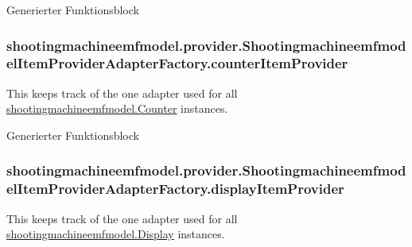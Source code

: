 Generierter Funktionsblock \hypertarget{classshootingmachineemfmodel_1_1provider_1_1_shootingmachineemfmodel_item_provider_adapter_factory_a66df12b1ede3faf4c051e2e72922bbbc}{
\subsubsection[{counter\-Item\-Provider}]{ shootingmachineemfmodel.\-provider.\-Shootingmachineemfmodel\-Item\-Provider\-Adapter\-Factory.\-counter\-Item\-Provider\hspace{0.3cm}{\ttfamily [protected]}}}\label{classshootingmachineemfmodel_1_1provider_1_1_shootingmachineemfmodel_item_provider_adapter_factory_a66df12b1ede3faf4c051e2e72922bbbc}
This keeps track of the one adapter used for all \hyperlink{interfaceshootingmachineemfmodel_1_1_counter}{shootingmachineemfmodel.\-Counter} instances.

Generierter Funktionsblock \hypertarget{classshootingmachineemfmodel_1_1provider_1_1_shootingmachineemfmodel_item_provider_adapter_factory_abed64251d753a775ee21b8cf1d23855b}{
\subsubsection[{display\-Item\-Provider}]{ shootingmachineemfmodel.\-provider.\-Shootingmachineemfmodel\-Item\-Provider\-Adapter\-Factory.\-display\-Item\-Provider\hspace{0.3cm}{\ttfamily [protected]}}}\label{classshootingmachineemfmodel_1_1provider_1_1_shootingmachineemfmodel_item_provider_adapter_factory_abed64251d753a775ee21b8cf1d23855b}
This keeps track of the one adapter used for all \hyperlink{interfaceshootingmachineemfmodel_1_1_display}{shootingmachineemfmodel.\-Display} instances.

